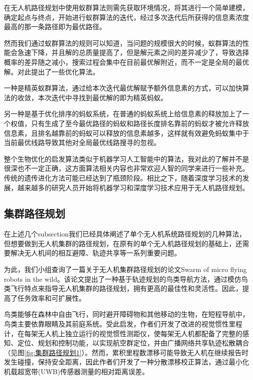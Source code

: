 \documentclass[conference]{IEEEtran}
\newcommand{\figref}[1]{图\ref{#1}}
\begin{document}
 在无人机路径规划中使用蚁群算法则需先获取环境情况，将其进行一个简单建模，确定起点与终点，开始进行蚁群算法的迭代，经过多次迭代后所获得的信息素浓度最高的那一条路径即为最优路径。

 然而我们通过蚁群算法的规则可以知道，当问题的规模很大的时候，蚁群算法的性能会急速下降，并且解的总质量提高了，但是解元素之间的差异减少了，导致选择概率的差异随之减小，搜索过程会集中在目前最优解附近，而不一定是全局的最优解。对此提出了一些优化算法。

 一种是精英蚁群算法，通过给本次迭代最优解赋予额外信息素的方式，可以加快算法的收敛，本次迭代中寻找到最优解的即为精英蚂蚁。

 另一种是基于优化排序的蚂蚁系统，在普通的蚂蚁系统上给信息素的释放加上了一个权值，只有生成了至今最优路径的蚂蚁和路径长度排名靠前的蚂蚁才被允许释放信息素，且排名越靠前的蚂蚁可以释放的信息素越多，这样就有效避免蚂蚁集中于当前最优线路导致其他对全局最优线路搜寻的忽视。

 整个生物优化的启发算法类似于机器学习人工智能中的算法，我对此的了解并不是很深也不一定正确，这方面算法相关内容也非常欢迎人智的同学来进行一些补充。传统的遗传进化方法可能已经达到了瓶颈阶段。相比之下，随着深度学习技术的发展，越来越多的研究人员开始将机器学习和深度学习技术应用于无人机路径规划。\cite{生物启发3}
 
\subsection{集群路径规划}%

在上述几个subsection我们已经具体阐述了单个无人机系统路径规划的几种算法，但想要做到无人机集群的路径规划，在原有的单个无人机路径规划的基础上，还需要解决无人机间的相互避障、轨迹共享等一系列重要问题。

为此，我们小组查询了一篇关于无人机集群路径规划的论文Swarm of micro flying robots in the wild\cite{集群路径规划}。该论文提出了一种基于轨迹规划的鸟类导航方法，通过模仿鸟类飞行特点来指导无人机集群的路径规划，拥有更高的最佳性和灵活性。因此，提高了任务效率和可扩展性。

鸟类能够在森林中自由飞行，同时避开障碍物和其他移动的生物，在短程导航中，鸟类主要依靠眼睛及其前庭系统。受此启发，作者们开发了改进的视觉惯性里程计，在每架无人机上独立运行的视觉惯性测距仪，使每架无人机都配备了完整的感知、定位、规划和控制功能，以实现航空群定位，并由广播网络共享轨迹松散耦合（见\figref{fig:集群路径规划1}）。然而，累积里程数漂移可能导致无人机在继续报告时发生碰撞，保持安全距离，因此作者们开发了一种分散漂移校正算法，通过最小化机载超宽带(UWB)传感器测量的相对距离误差。
\end{document}
